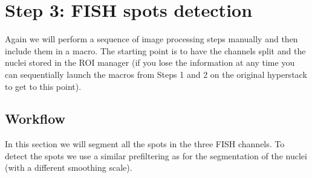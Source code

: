 \section{Step 3: FISH spots detection}

Again we will perform a sequence of image processing steps manually and then include them in a macro. The starting point is to have the channels split and the nuclei stored in the ROI manager (if you lose the information at any time you can sequentially launch the macros from Steps 1 and 2 on the original hyperstack to get to this point).

\subsection{Workflow}
In this section we will segment all the spots in the three FISH channels. To detect the spots we use a similar prefiltering as for the segmentation of the nuclei (with a different smoothing scale).
